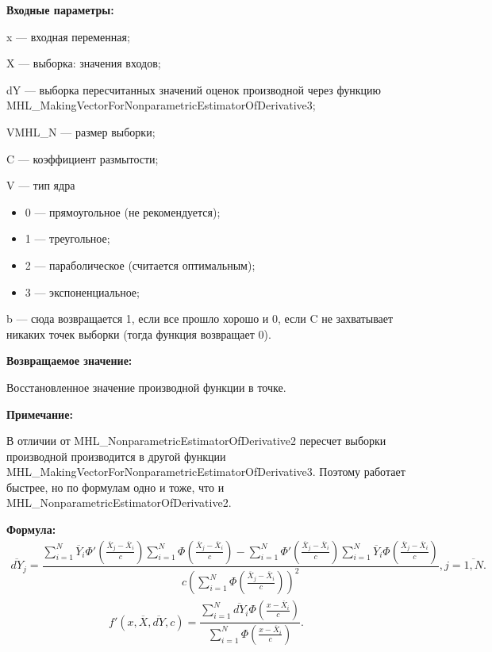 \textbf{Входные параметры:} 
 
x --- входная переменная;
 
X --- выборка: значения входов;
 
dY --- выборка пересчитанных значений оценок производной через функцию MHL\_MakingVectorForNonparametricEstimatorOfDerivative3;
 
VMHL\_N --- размер выборки;
 
C --- коэффициент размытости;
 
V --- тип ядра
 
 \begin{itemize}
 \item  0 --- прямоугольное (не рекомендуется);
 \item  1 --- треугольное;
 \item  2 --- параболическое (считается оптимальным);
 \item  3 --- экспоненциальное;
 \end{itemize}
 
b --- сюда возвращается 1, если все прошло хорошо и 0, если C не захватывает никаких точек выборки (тогда функция возвращает 0).

\textbf{Возвращаемое значение:}
 
 Восстановленное значение производной функции в точке.
 
\textbf{Примечание:}

В отличии от MHL\_NonparametricEstimatorOfDerivative2 пересчет выборки производной производится в другой функции MHL\_MakingVectorForNonparametricEstimatorOfDerivative3. Поэтому работает быстрее, но по формулам одно и тоже, что и MHL\_NonparametricEstimatorOfDerivative2.

\textbf{Формула:}
\begin{eqnarray*}
\overline{dY}_j =\dfrac{\sum_{i=1}^{N}\overline{Y}_i{\Phi}'\left( \frac{\overline{X}_j-\overline{X}_i}{c}\right) \sum_{i=1}^{N}\Phi\left( \frac{\overline{X}_j-\overline{X}_i}{c}\right)-\sum_{i=1}^{N}{\Phi}'\left( \frac{\overline{X}_j-\overline{X}_i}{c}\right) \sum_{i=1}^{N}\overline{Y}_i\Phi\left( \frac{\overline{X}_j-\overline{X}_i}{c}\right)}{c\left( \sum_{i=1}^{N}\Phi\left( \frac{\overline{X}_j-\overline{X}_i}{c}\right)\right)^2 }, j=\overline{1,N}.
\end{eqnarray*}
\begin{eqnarray*}
{f}'\left( x, \overline{X},\overline{dY}, c\right) =\dfrac{\sum_{i=1}^{N}\overline{dY}_i\Phi\left( \frac{x-\overline{X}_i}{c}\right) }{\sum_{i=1}^{N}\Phi\left( \frac{x-\overline{X}_i}{c}\right) }.
\end{eqnarray*}

